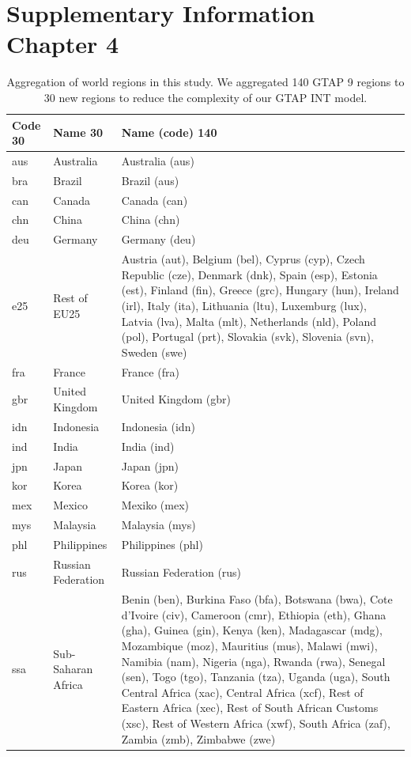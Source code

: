 \documentclass[titlesmallcaps,copyrightpage]{uomthesis}\usepackage[]{graphicx}\usepackage[]{color}
\begin{document}
\chapter{Supplementary Information Chapter 4}\label{apx:ch4}

\begin{table}[htb]
\centering
\caption{Aggregation of world regions in this study. We aggregated 140 GTAP 9 regions to 30 new regions to reduce the complexity of our GTAP INT model.}
\label{apx:ch4:gtapaggr}
\begin{tabularx}{\textwidth}{llY}
\toprule
Code 30 & Name 30 & Name (code) 140 \\
\bottomrule
aus & Australia & Australia (aus) \\
bra & Brazil & Brazil (aus) \\
can & Canada & Canada (can) \\
chn & China & China (chn) \\
deu & Germany & Germany (deu) \\
e25 & Rest of EU25 & Austria (aut), Belgium (bel), Cyprus (cyp), Czech Republic (cze), Denmark (dnk), Spain (esp), Estonia (est), Finland (fin), Greece (grc), Hungary (hun), Ireland (irl), Italy (ita), Lithuania (ltu), Luxemburg (lux), Latvia (lva), Malta (mlt), Netherlands (nld), Poland (pol), Portugal (prt), Slovakia (svk), Slovenia (svn), Sweden (swe) \\
fra & France & France (fra) \\
gbr & United Kingdom & United Kingdom (gbr) \\
idn & Indonesia & Indonesia (idn) \\
ind & India & India (ind) \\
jpn & Japan & Japan (jpn) \\
kor & Korea & Korea (kor) \\
mex & Mexico & Mexiko (mex) \\
mys & Malaysia & Malaysia (mys) \\
phl & Philippines & Philippines (phl) \\
rus & Russian Federation & Russian Federation (rus) \\
ssa & Sub-Saharan Africa & Benin (ben), Burkina Faso (bfa), Botswana (bwa), Cote d'Ivoire (civ), Cameroon (cmr), Ethiopia (eth), Ghana (gha), Guinea (gin), Kenya (ken), Madagascar (mdg), Mozambique (moz), Mauritius (mus), Malawi (mwi), Namibia (nam), Nigeria (nga), Rwanda (rwa), Senegal (sen), Togo (tgo), Tanzania (tza), Uganda (uga), South Central Africa (xac), Central Africa (xcf), Rest of Eastern Africa (xec), Rest of South African Customs (xsc), Rest of Western Africa (xwf), South Africa (zaf), Zambia (zmb), Zimbabwe (zwe) \\

\end{tabularx}
\end{table}
\end{document}
